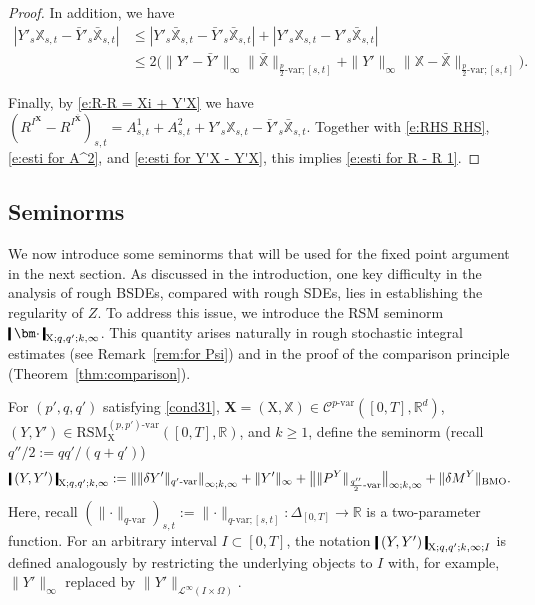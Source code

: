 \documentclass[11pt,reqno]{amsart}
\numberwithin{equation}{section}
\def\R{\mathbb R}
\newcommand{\shortthickbar}{%
  \vcenter{\hbox{\rule{1.8pt}{2.2ex}}}%
}
\newcommand{\thicknm}[1]{%
  \mathopen{\shortthickbar}%
  \mkern4mu #1 \mkern4mu%
  \mathclose{\shortthickbar}%
}
\begin{document}
\begin{proof}
In addition, we have
\begin{equation}\label{e:esti for Y'X - Y'X}
\begin{aligned}
|Y'_{s}\mathbb X_{s,t} - \bar Y'_{s}\bar{\mathbb X}_{s,t}| &\le | Y'_{s} \bar{\mathbb X}_{s,t} - \bar Y'_{s} \bar{\mathbb X}_{s,t} | + | Y'_{s}\mathbb X_{s,t}  - Y'_{s} \bar{\mathbb X}_{s,t} | \\
&\le 2 \big( \|Y' - \bar Y'\|_{\infty} \| \bar{\mathbb X} \|_{\frac{p}{2}\text{-}\mathrm{var};[s,t]} + \|Y'\|_{\infty} \| \mathbb X - \bar{\mathbb X} \|_{\frac{p}{2}\text{-}\mathrm{var};[s,t]} \big). 
\end{aligned}
\end{equation}

Finally, by \eqref{e:R-R = Xi + Y'X} we have $(R^{I^{\mathbf X}} - R^{I^{\bar{ \mathbf X}}})_{s,t} = A^1_{s,t} + A^2_{s,t} + Y'_{s}\mathbb X_{s,t} - \bar Y'_{s}\bar{\mathbb X}_{s,t}$. Together with \eqref{e:RHS RHS}, \eqref{e:esti for A^2}, and \eqref{e:esti for Y'X - Y'X}, this implies
\eqref{e:esti for R - R 1}.  
\end{proof}






\subsection{Seminorms}\label{subsec:seminorms}

We now introduce some seminorms that will be used  for the fixed point argument in the next section.
As discussed in the introduction, one key difficulty in the analysis of rough BSDEs, compared with rough SDEs, lies in establishing the regularity of $Z$. To address this issue, we introduce the \textrm{RSM} seminorm $\thicknm{\bm \cdot}_{\mathrm X;q,q';k,\infty}$. This quantity arises naturally in rough stochastic integral estimates (see Remark~\ref{rem:for Psi}) and in the proof of the comparison principle (Theorem~\ref{thm:comparison}). 

For $(p',q,q')$ satisfying \eqref{cond31}, $\mathbf X = (\mathrm X,\mathbb X) \in \mathscr{C}^{p\text{-}\mathrm{var}}([0,T],\R^d)$, $(Y,Y') \in \mathrm{RSM}^{(p,p')\text{-}\mathrm{var}}_{\mathrm X}([0,T],\R)$, and $k \ge 1$, define the seminorm (recall $q''/2 := qq'/(q+q')$)  
\begin{equation}\label{e:Psi}
\thicknm{(Y,Y')}_{\mathrm X;q,q';k,\infty} :=  \left\|\|\delta Y'\|_{q'\text{-}\mathrm{var}}\right\|_{\infty;k,\infty} + \|Y'\|_{\infty} + \big\| \|P^{Y}\|_{\frac{q''}{2}\text{-}\mathrm{var}} \big\|_{\infty;k,\infty} + \|\delta M^{Y}\|_{\mathrm{BMO}}.
\end{equation}
Here, recall  $(\|\bm\cdot\|_{q\text{-}\mathrm{var}})_{s,t} := \|\bm\cdot\|_{q\text{-}\mathrm{var};[s,t]}: \Delta_{[0,T]}\to \R$ is a two-parameter function.
For an arbitrary interval $I\subset [0,T]$, the notation $\thicknm{(Y,Y')}_{\mathrm X;q,q';k,\infty;I}$ is defined analogously by restricting the underlying objects to $I$ with, for example, $\|Y'\|_{\infty}$ replaced by $\|Y'\|_{\mathcal L^{\infty}(I \times \Omega)}$.
\end{document}
